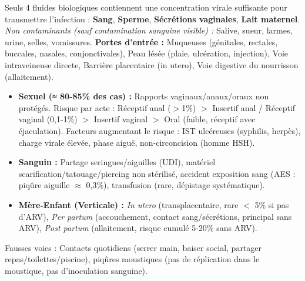 \documentclass[11pt]{article}
\newcommand{\cle}[1]{{\popxbold\color{popdark}#1}}
\newcounter{popsec}
\newcounter{popsub}
\newcommand{\courssub}[1]{%
  \stepcounter{popsub}%
  \par\vspace{9pt}\noindent{\popxbold\fontsize{11.5}{13}\selectfont\color{popink}{\color{poporange}\thepopsec.\thepopsub}\hspace{6pt}#1}\par\nopagebreak\vspace{4pt}
}
\begin{document}
\courssub{Transmission et prévention}

\begin{definition}
Seuls 4 fluides biologiques contiennent une concentration virale suffisante pour transmettre l'infection : \textbf{Sang}, \textbf{Sperme}, \textbf{Sécrétions vaginales}, \textbf{Lait maternel}.
\emph{Non contaminants (sauf contamination sanguine visible) :} Salive, sueur, larmes, urine, selles, vomissures.
\textbf{Portes d'entrée :} Muqueuses (génitales, rectales, buccales, nasales, conjonctivales), Peau lésée (plaie, ulcération, injection), Voie intraveineuse directe, Barrière placentaire (in utero), Voie digestive du nourrisson (allaitement).
\end{definition}

\begin{propriete}
\begin{itemize}
    \item \textbf{Sexuel (≈ 80-85\% des cas) :} Rapports vaginaux/anaux/oraux non protégés. Risque par acte : Réceptif anal ($>$1\%) $>$ Insertif anal / Réceptif vaginal (0,1-1\%) $>$ Insertif vaginal $>$ Oral (faible, réceptif avec éjaculation). Facteurs augmentant le risque : IST ulcéreuses (syphilis, herpès), charge virale élevée, phase aiguë, non-circoncision (homme HSH).
    \item \textbf{Sanguin :} Partage seringues/aiguilles (UDI), matériel scarification/tatouage/piercing non stérilisé, accident exposition sang (AES : piqûre aiguille $\approx$ 0,3\%), transfusion (rare, dépistage systématique).
    \item \textbf{Mère-Enfant (Verticale) :} \emph{In utero} (transplacentaire, rare $<$ 5\% si pas d'ARV), \emph{Per partum} (accouchement, contact sang/sécrétions, principal sans ARV), \emph{Post partum} (allaitement, risque cumulé 5-20\% sans ARV).
\end{itemize}
\cle{Fausses voies :} Contacts quotidiens (serrer main, baiser social, partager repas/toilettes/piscine), piqûres moustiques (pas de réplication dans le moustique, pas d'inoculation sanguine).
\end{propriete}
\end{document}
